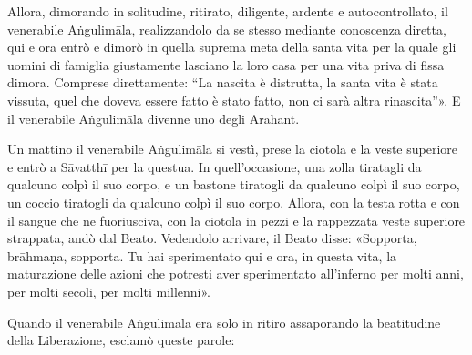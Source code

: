 Allora, dimorando in solitudine, ritirato, diligente, ardente e autocontrollato,
il venerabile Aṅgulimāla, realizzandolo da se stesso mediante conoscenza
diretta, qui e ora entrò e dimorò in quella suprema meta della santa vita per la
quale gli uomini di famiglia giustamente lasciano la loro casa per una vita
priva di fissa dimora. Comprese direttamente: “La nascita è distrutta, la santa
vita è stata vissuta, quel che doveva essere fatto è stato fatto, non ci sarà
altra rinascita”». E il venerabile Aṅgulimāla divenne uno degli Arahant.

Un mattino il venerabile Aṅgulimāla si vestì, prese la ciotola e la veste
superiore e entrò a Sāvatthī per la questua. In quell’occasione, una zolla
tiratagli da qualcuno colpì il suo corpo, e un bastone tiratogli da qualcuno
colpì il suo corpo, un coccio tiratogli da qualcuno colpì il suo corpo. Allora,
con la testa rotta e con il sangue che ne fuoriusciva, con la ciotola in pezzi e
la rappezzata veste superiore strappata, andò dal Beato. Vedendolo arrivare, il
Beato disse: «Sopporta, brāhmaṇa, sopporta. Tu hai sperimentato qui e ora, in
questa vita, la maturazione delle azioni che potresti aver sperimentato
all’inferno per molti anni, per molti secoli, per molti millenni».

Quando il venerabile Aṅgulimāla era solo in ritiro assaporando la beatitudine
della Liberazione, esclamò queste parole:


